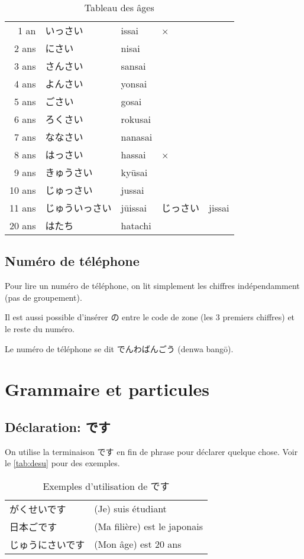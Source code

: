 \documentclass[a4paper,10pt,french,openany]{memoir}
\begin{document}
\begin{table}[htbp]
 \centering
 \begin{tabular}{rllll}
  1 an  & いっさい    &issai&×\\
  2 ans & にさい     　&nisai\\
  3 ans & さんさい    &sansai\\
  4 ans & よんさい    &yonsai\\
  5 ans & ごさい    　&gosai\\
  6 ans & ろくさい    　&rokusai\\
  7 ans & ななさい   　&nanasai\\
  8 ans & はっさい  　　&hassai&×\\
  9 ans & きゅうさい   &kyūsai\\
  10 ans& じゅっさい  　&jussai\\
  11 ans& じゅういっさい&jūissai & じっさい & jissai\\
  20 ans& はたち　　　　&hatachi
 \end{tabular}
 \caption{Tableau des âges}
 \label{tab:age}
\end{table}

\section{Numéro de téléphone}

Pour lire un numéro de téléphone, on lit simplement les chiffres indépendamment (pas de groupement).

Il est aussi possible d'insérer の entre le code de zone (les 3 premiers chiffres) et le reste du numéro.

Le numéro de téléphone se dit でんわばんごう (denwa bangō).

\chapter{Grammaire et particules}

\section{Déclaration: です}
On utilise la terminaison です en fin de phrase pour déclarer quelque chose. Voir le \autoref{tab:desu} pour des exemples.

\begin{table}[htbp]
 \centering
 \begin{tabular}{ll}
  がくせいです & (Je) suis étudiant \\
  日本ごです & (Ma filière) est le japonais\\
  じゅうにさいです & (Mon âge) est 20 ans\\
 \end{tabular}
 \caption{Exemples d'utilisation de です}
 \label{tab:desu}
\end{table}
\end{document}
